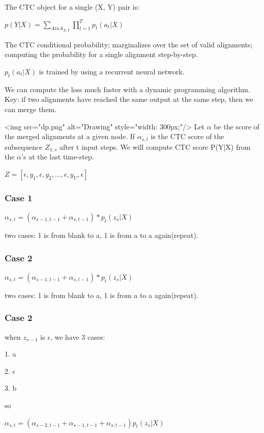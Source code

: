 \documentclass[a4paper]{article}
\begin{document}
The CTC object for a single (X, Y) pair is:

$ p(Y|X) = \sum_{A in A_{X,Y}} \prod_{t=1}^T p_t(a_t|X)$

The CTC conditional probability; marginalizes over the set of valid alignments; computing the probability for a single alignment step-by-step.

$p_t(a_t|X)$ is trained by using a recurrent neural network. 

We can compute the loss much faster with a dynamic programming algorithm. Key: if two alignments have reached the same output at the same step, then we can merge them.

<img src="dp.png" alt="Drawing" style="width: 300px;"/>
Let $\alpha$ be the score of the merged alignments at a given node. If $\alpha_{s,t}$ is the CTC score of the subsequence $Z_{1:s}$ after t input steps. We will compute CTC score P(Y|X) from the $\alpha$'s at the last time-step.

$Z = [\epsilon,y_1,\epsilon,y_2,...,\epsilon,y_U,\epsilon]$

\subsubsection{Case 1}
$\alpha_{s,t} = (\alpha_{s-1,t-1}+\alpha_{s,t-1})*p_t(z_s|X)$

two cases: 1 is from blank to a, 1 is from a to a again(repeat).

\subsubsection{Case 2}

$\alpha_{s,t} = (\alpha_{s-1,t-1}+\alpha_{s,t-1})*p_t(z_s|X)$

two cases: 1 is from blank to a, 1 is from a to a again(repeat).

\subsubsection{Case 2}

when $z_{s-1}$ is $\epsilon$, we have 3 cases:

1. a

2. $\epsilon$

3. b

so 

$\alpha_{s,t} = (\alpha_{s-2,t-1}+\alpha_{s-1,t-1}+\alpha_{s,t-1})p_t(z_s|X)$
\end{document}
